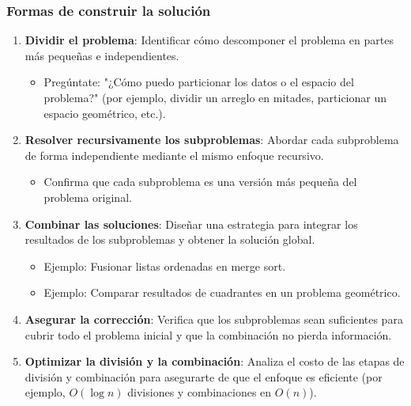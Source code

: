 \subsubsection{Formas de construir la solución}  
\begin{enumerate}  
  \item \textbf{Dividir el problema}: Identificar cómo descomponer el problema en partes más pequeñas e independientes.  
  \begin{itemize}  
    \item Pregúntate: "¿Cómo puedo particionar los datos o el espacio del problema?" (por ejemplo, dividir un arreglo en mitades, particionar un espacio geométrico, etc.).  
  \end{itemize}  

  \item \textbf{Resolver recursivamente los subproblemas}: Abordar cada subproblema de forma independiente mediante el mismo enfoque recursivo.  
  \begin{itemize}  
    \item Confirma que cada subproblema es una versión más pequeña del problema original.  
    \end{itemize}  

  \item \textbf{Combinar las soluciones}: Diseñar una estrategia para integrar los resultados de los subproblemas y obtener la solución global.  
  \begin{itemize}  
    \item Ejemplo: Fusionar listas ordenadas en merge sort.  
    \item Ejemplo: Comparar resultados de cuadrantes en un problema geométrico.  
  \end{itemize}  

  \item \textbf{Asegurar la corrección}: Verifica que los subproblemas sean suficientes para cubrir todo el problema inicial y que la combinación no pierda información.  

  \item \textbf{Optimizar la división y la combinación}: Analiza el costo de las etapas de división y combinación para asegurarte de que el enfoque es eficiente (por ejemplo, $O(\log n)$ divisiones y combinaciones en $O(n)$).  
\end{enumerate}  

